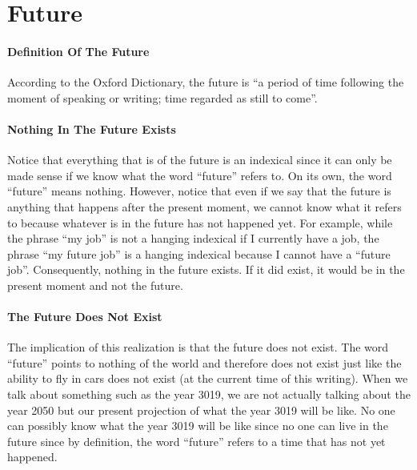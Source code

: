\documentclass[a4paper, 12pt]{article}
\begin{document}
\section*{Future}
\paragraph{Definition Of The Future}
According to the Oxford Dictionary, the future is ``a period of time following the moment of speaking or writing; time regarded as still to come''.
\paragraph{Nothing In The Future Exists}
Notice that everything that is of the future is an indexical since it can only be made sense if we know what the word ``future'' refers to. On its own, the word ``future'' means nothing. However, notice that even if we say that the future is anything that happens after the present moment, we cannot know what it refers to because whatever is in the future has not happened yet. For example, while the phrase ``my job'' is not a hanging indexical if I currently have a job, the phrase ``my future job'' is a hanging indexical because I cannot have a ``future job''. Consequently, nothing in the future exists. If it did exist, it would be in the present moment and not the future.
\paragraph{The Future Does Not Exist}
The implication of this realization is that the future does not exist. The word ``future'' points to nothing of the world and therefore does not exist just like the ability to fly in cars does not exist (at the current time of this writing). When we talk about something such as the year 3019, we are not actually talking about the year 2050 but our present projection of what the year 3019 will be like. No one can possibly know what the year 3019 will be like since no one can live in the future since by definition, the word ``future'' refers to a time that has not yet happened.
\end{document}
